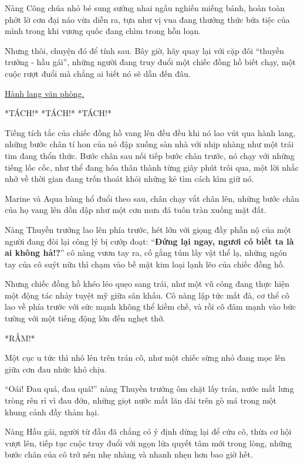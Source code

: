\documentclass[../main.tex]{subfiles}
\begin{document}
Nàng Công chúa nhỏ bé sung sướng nhai ngấu nghiến miếng bánh, hoàn toàn phớt lờ cơn đại náo vừa diễn ra, tựa như vị vua đang thưởng thức bữa tiệc của mình trong khi vương quốc đang chìm trong hỗn loạn.

Nhưng thôi, chuyện đó để tính sau. Bây giờ, hãy quay lại với cặp đôi ``thuyền trưởng - hầu gái'', những người đang truy đuổi một chiếc đồng hồ biết chạy, một cuộc rượt đuổi mà chẳng ai biết nó sẽ dẫn đến đâu.

\ct

\begin{center}
  \uline{Hành lang văn phòng.}
\end{center}

*TÁCH!* *TÁCH!* *TÁCH!*

Tiếng tích tắc của chiếc đồng hồ vang lên đều đều khi nó lao vút qua hành lang, những bước chân tí hon của nó đập xuống sàn nhà với nhịp nhàng như một trái tim đang thổn thức. Bước chân sau nối tiếp bước chân trước, nó chạy với những tiếng lốc cốc, như thể đang hóa thân thành từng giây phút trôi qua, một lời nhắc nhở về thời gian đang trốn thoát khỏi những kẻ tìm cách kìm giữ nó.

Marine và Aqua hùng hổ đuổi theo sau, chân chạy vắt chân lên, những bước chân của họ vang lên dồn dập như một cơn mưa đá tuôn tràn xuống mặt đất.

Nàng Thuyền trưởng lao lên phía trước, hét lớn với giọng đầy phẫn nộ của một người đang đòi lại công lý bị cướp đoạt: ``\textbf{Đứng lại ngay, ngươi có biết ta là ai không hả!?}'' cô nàng vươn tay ra, cố gắng túm lấy vật thể lạ, những ngón tay của cô suýt nữa thì chạm vào bề mặt kim loại lạnh lẽo của chiếc đồng hồ.

Nhưng chiếc đồng hồ khéo léo quẹo sang trái, như một vũ công đang thực hiện một động tác nhảy tuyệt mỹ giữa sân khấu. Cô nàng lập tức mất đà, cơ thể cô lao về phía trước với sức mạnh không thể kiềm chế, và rồi cô đâm mạnh vào bức tường với một tiếng động lớn đến nghẹt thở.

*RẦM!*

Một cục u tức thì nhô lên trên trán cô, như một chiếc sừng nhỏ đang mọc lên giữa cơn đau nhức khó chịu.

``Oái! Đau quá, đau quá!'' nàng Thuyền trưởng ôm chặt lấy trán, nước mắt lưng tròng rên rỉ vì đau đớn, những giọt nước mắt lăn dài trên gò má trong một khung cảnh đầy thảm hại.

Nàng Hầu gái, người từ đầu đã chẳng có ý định dừng lại để cứu cô, thừa cơ hội vượt lên, tiếp tục cuộc truy đuổi với ngọn lửa quyết tâm mới trong lòng, những bước chân của cô trở nên nhẹ nhàng và nhanh nhẹn hơn bao giờ hết.
\end{document}

